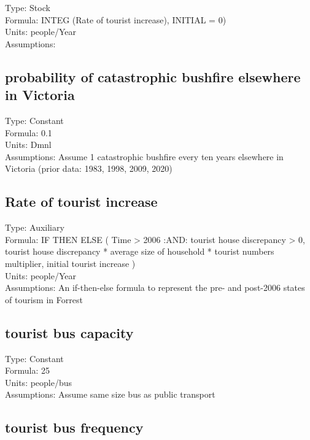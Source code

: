 \documentclass[
  11pt,
]{book}
\begin{document}
Type: Stock\\
Formula: INTEG (Rate of tourist increase), INITIAL = 0)\\
Units: people/Year\\
Assumptions:

\hypertarget{probability-of-catastrophic-bushfire-elsewhere-in-victoria}{%
\subsection{probability of catastrophic bushfire elsewhere in Victoria}\label{probability-of-catastrophic-bushfire-elsewhere-in-victoria}}

Type: Constant\\
Formula: 0.1\\
Units: Dmnl\\
Assumptions: Assume 1 catastrophic bushfire every ten years elsewhere in Victoria (prior data: 1983, 1998, 2009, 2020)

\hypertarget{rate-of-tourist-increase}{%
\subsection{Rate of tourist increase}\label{rate-of-tourist-increase}}

Type: Auxiliary\\
Formula: IF THEN ELSE ( Time \textgreater{} 2006 :AND: tourist house discrepancy \textgreater{} 0, tourist house discrepancy * average size of household * tourist numbers multiplier, initial tourist increase )\\
Units: people/Year\\
Assumptions: An if-then-else formula to represent the pre- and post-2006 states of tourism in Forrest

\hypertarget{tourist-bus-capacity}{%
\subsection{tourist bus capacity}\label{tourist-bus-capacity}}

Type: Constant\\
Formula: 25\\
Units: people/bus\\
Assumptions: Assume same size bus as public transport

\hypertarget{tourist-bus-frequency}{%
\subsection{tourist bus frequency}\label{tourist-bus-frequency}}
\end{document}
